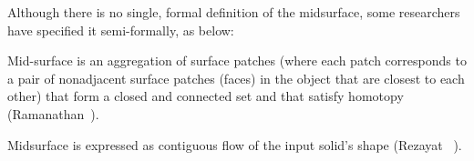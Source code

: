 Although there is no single, formal definition of the midsurface, some researchers have specified it semi-formally, as below:

\begin{mydef}\label{def:midsram}
Mid-surface is an aggregation of surface patches (where each patch corresponds to a pair of nonadjacent surface patches (faces) in the object that are closest to each other) that form a closed and connected set and that satisfy homotopy (Ramanathan~\cite{Ramanathan2004}).
\end{mydef}

\begin{mydef}\label{def:midsrez}
Midsurface is expressed as contiguous flow of the input solid's shape (Rezayat ~\cite{Rezayat1996}).
\end{mydef}

